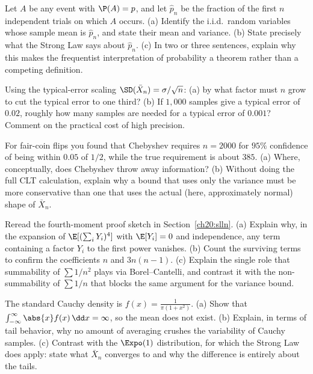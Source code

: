 \begin{exercise}
Let $A$ be any event with $\P(A)=p$, and let $\hat p_n$ be the fraction of the first $n$ independent trials on which $A$ occurs. (a) Identify the i.i.d.\ random variables whose sample mean is $\hat p_n$, and state their mean and variance. (b) State precisely what the Strong Law says about $\hat p_n$. (c) In two or three sentences, explain why this makes the frequentist interpretation of probability a theorem rather than a competing definition.
\end{exercise}

\begin{exercise}
Using the typical-error scaling $\SD(\bar X_n)=\sigma/\sqrt n$: (a) by what factor must $n$ grow to cut the typical error to one third? (b) If $1{,}000$ samples give a typical error of $0.02$, roughly how many samples are needed for a typical error of $0.001$? Comment on the practical cost of high precision.
\end{exercise}

\begin{exercise}
For fair-coin flips you found that Chebyshev requires $n=2000$ for $95\%$ confidence of being within $0.05$ of $1/2$, while the true requirement is about $385$. (a) Where, conceptually, does Chebyshev throw away information? (b) Without doing the full CLT calculation, explain why a bound that uses only the variance must be more conservative than one that uses the actual (here, approximately normal) shape of $\bar X_n$.
\end{exercise}

\begin{exercise}
Reread the fourth-moment proof sketch in Section~\ref{ch20:slln}. (a) Explain why, in the expansion of $\E[(\sum_i Y_i)^4]$ with $\E[Y_i]=0$ and independence, any term containing a factor $Y_i$ to the first power vanishes. (b) Count the surviving terms to confirm the coefficients $n$ and $3n(n-1)$. (c) Explain the single role that summability of $\sum 1/n^2$ plays via Borel--Cantelli, and contrast it with the non-summability of $\sum 1/n$ that blocks the same argument for the variance bound.
\end{exercise}

\begin{exercise}
The standard Cauchy density is $f(x)=\frac{1}{\pi(1+x^2)}$. (a) Show that $\int_{-\infty}^{\infty}\abs{x}f(x)\,\dd x=\infty$, so the mean does not exist. (b) Explain, in terms of tail behavior, why no amount of averaging crushes the variability of Cauchy samples. (c) Contrast with the $\Expo(1)$ distribution, for which the Strong Law does apply: state what $\bar X_n$ converges to and why the difference is entirely about the tails.
\end{exercise}

